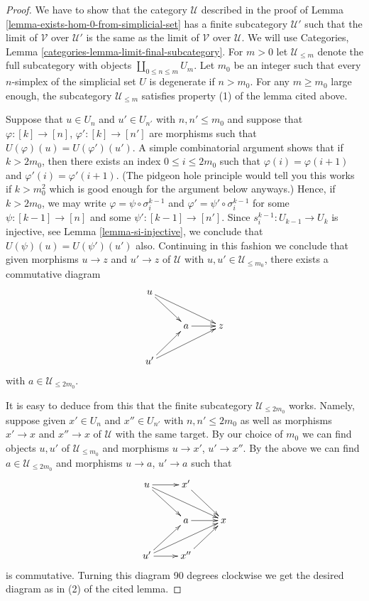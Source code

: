 \begin{proof}
We have to show that the category $\mathcal{U}$ described
in the proof of Lemma \ref{lemma-exists-hom-0-from-simplicial-set}
has a finite subcategory $\mathcal{U}'$ such that the limit
of $\mathcal{V}$ over $\mathcal{U}'$ is the same as the
limit of $\mathcal{V}$ over $\mathcal{U}$. We will use
Categories, Lemma \ref{categories-lemma-limit-final-subcategory}.
For $m > 0$ let $\mathcal{U}_{\leq m}$ denote the full
subcategory with objects $\coprod_{0 \leq n \leq m} U_m$.
Let $m_0$ be an integer such that every $n$-simplex
of the simplicial set $U$ is degenerate if $n > m_0$.
For any $m \geq m_0$ large enough, the subcategory
$\mathcal{U}_{\leq m}$ satisfies property (1) of the lemma
cited above.

\medskip\noindent
Suppose that $u \in U_n$ and
$u' \in U_{n'}$ with $n, n' \leq m_0$ and suppose that
$\varphi : [k] \to [n]$, $\varphi' : [k] \to [n']$
are morphisms such that $U(\varphi)(u) = U(\varphi')(u')$.
A simple combinatorial argument shows that if $k > 2m_0$,
then there exists an index $0 \leq i \leq 2m_0$ such that
$\varphi(i) =\varphi(i + 1)$ and $\varphi'(i) = \varphi'(i + 1)$.
(The pidgeon hole principle would tell you this works if
$k > m_0^2$ which is good enough for the argument below
anyways.) Hence, if $k > 2m_0$, we may write
$\varphi = \psi \circ \sigma^{k - 1}_i$ and
$\varphi' = \psi' \circ \sigma^{k - 1}_i$ for some
$\psi : [k - 1] \to [n]$ and some $\psi' : [k - 1] \to [n']$.
Since $s^{k - 1}_i : U_{k - 1} \to U_k$ is injective,
see Lemma \ref{lemma-si-injective}, we conclude that
$U(\psi)(u) = U(\psi')(u')$ also. Continuing in this
fashion we conclude that given morphisms
$u \to z$ and $u' \to z$ of $\mathcal{U}$
with $u, u' \in \mathcal{U}_{\leq m_0}$, there exists
a commutative diagram
$$
\xymatrix{
u \ar[rd] \ar[rrd] & & \\
& a \ar[r] & z \\
u' \ar[ru] \ar[rru]
}
$$
with $a \in \mathcal{U}_{\leq 2m_0}$.

\medskip\noindent
It is easy to deduce from this that the finite subcategory
$\mathcal{U}_{\leq 2m_0}$ works. Namely, suppose given
$x' \in U_n$ and $x'' \in U_{n'}$ with $n, n' \leq 2m_0$ as well as
morphisms $x' \to x$ and $x'' \to x$ of $\mathcal{U}$
with the same target. By our choice of $m_0$ we can
find objects $u, u'$ of $\mathcal{U}_{\leq m_0}$ and
morphisms $u \to x'$, $u' \to x''$.
By the above we can find $a \in \mathcal{U}_{\leq 2m_0}$
and morphisms $u \to a$, $u' \to a$ such that
$$
\xymatrix{
u \ar[rd] \ar[rrd] \ar[r] & x' \ar[rd] & \\
& a \ar[r] & x \\
u' \ar[ru] \ar[rru] \ar[r] & x'' \ar[ru] &
}
$$
is commutative. Turning this diagram 90 degrees clockwise
we get the desired diagram as in (2) of the
cited lemma.
\end{proof}

